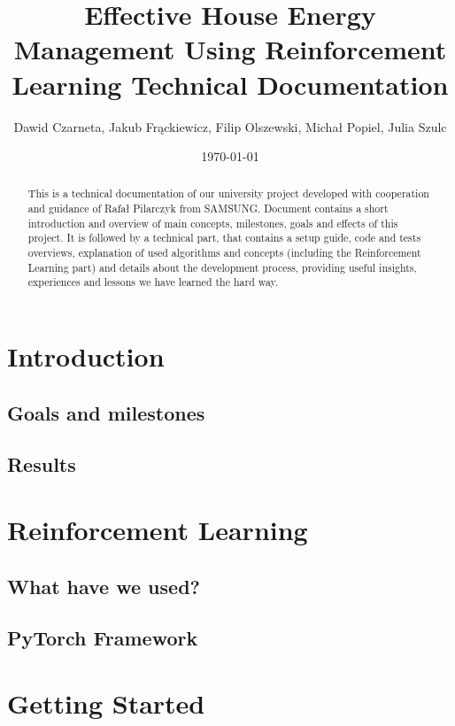 \documentclass{article}
\title{Effective House Energy Management Using Reinforcement Learning Technical Documentation} %
\author{Dawid Czarneta, Jakub Frąckiewicz, Filip Olszewski, Michał Popiel, Julia Szulc}
\date{\today}
\begin{document}
\maketitle %

\begin{abstract}
This is a technical documentation of our university project developed with cooperation and
guidance of Rafał Pilarczyk from SAMSUNG. Document contains a short introduction and overview of main concepts, milestones, goals and effects of this project. It is followed by a technical part, that contains a setup guide, code and tests overviews, explanation of used algorithms and concepts (including the Reinforcement Learning part) and details about the development process, providing useful insights, experiences and lessons we have learned the hard way.
\end{abstract}

\section{Introduction}

\subsection{Goals and milestones}
\subsection{Results}

\section{Reinforcement Learning}
\subsection{What have we used?}
\subsection{PyTorch Framework}
\section{Getting Started}
\end{document}
